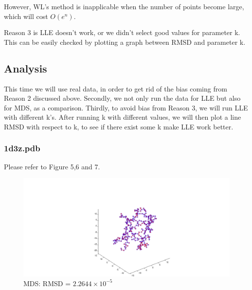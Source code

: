 \documentclass[12pt]{article} %
\begin{document}
However, WL's method is inapplicable when the number of points become large, which will cost $O(e^n)$.

Reason 3 is LLE doesn't work, or we didn't select good values for parameter k. This can be easily checked by plotting a graph between RMSD and parameter k.


\subsection{Analysis}

This time we will use real data, in order to get rid of the bias coming from Reason 2 discussed above. Secondly, we not only run the data for LLE but also for MDS, as a comparison. Thirdly, to avoid bias from Reason 3, we will run LLE with different k's. After running k with different values, we will then plot a line RMSD with respect to k, to see if there exist some k make LLE work better.

\subsubsection{1d3z.pdb}
Please refer to Figure 5,6 and 7.

\begin{figure}[ht]\centering
	\includegraphics[scale=0.3]{fig01}
	\caption{MDS: RMSD = $2.2644 \times 10^{-5}$}
\end{figure}
\end{document}
